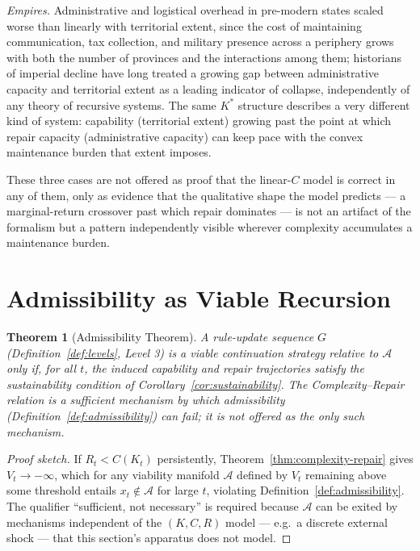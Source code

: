 \documentclass[12pt,a4paper]{article}
\theoremstyle{plain}
\newtheorem{theorem}{Theorem}[section]
\theoremstyle{definition}
\theoremstyle{remark}
\newcommand{\Adm}{\mathcal{A}}
\begin{document}
\emph{Empires.} Administrative and logistical overhead in pre-modern states scaled worse than linearly with territorial extent, since the cost of maintaining communication, tax collection, and military presence across a periphery grows with both the number of provinces and the interactions among them; historians of imperial decline have long treated a growing gap between administrative capacity and territorial extent as a leading indicator of collapse, independently of any theory of recursive systems. The same $K^\ast$ structure describes a very different kind of system: capability (territorial extent) growing past the point at which repair capacity (administrative capacity) can keep pace with the convex maintenance burden that extent imposes.

These three cases are not offered as proof that the linear-$C$ model is correct in any of them, only as evidence that the qualitative shape the model predicts — a marginal-return crossover past which repair dominates — is not an artifact of the formalism but a pattern independently visible wherever complexity accumulates a maintenance burden.

\section{Admissibility as Viable Recursion}
\label{sec:admissibility-viable}

\begin{theorem}[Admissibility Theorem]
\label{thm:admissibility}
A rule-update sequence $G$ (Definition~\ref{def:levels}, Level 3) is a viable continuation strategy relative to $\Adm$ only if, for all $t$, the induced capability and repair trajectories satisfy the sustainability condition of Corollary~\ref{cor:sustainability}. The Complexity--Repair relation is a sufficient mechanism by which admissibility (Definition~\ref{def:admissibility}) can fail; it is not offered as the only such mechanism.
\end{theorem}

\begin{proof}[Proof sketch]
If $R_t < C(K_t)$ persistently, Theorem~\ref{thm:complexity-repair} gives $V_t \to -\infty$, which for any viability manifold $\Adm$ defined by $V_t$ remaining above some threshold entails $x_t \notin \Adm$ for large $t$, violating Definition~\ref{def:admissibility}. The qualifier ``sufficient, not necessary'' is required because $\Adm$ can be exited by mechanisms independent of the $(K,C,R)$ model — e.g.\ a discrete external shock — that this section's apparatus does not model.
\end{proof}
\end{document}
